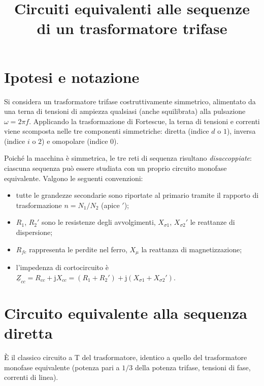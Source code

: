 \documentclass[11pt,a4paper]{article}
\title{Circuiti equivalenti alle sequenze\\di un trasformatore trifase}
\author{}
\date{}
\newcommand{\ph}[1]{\underline{#1}}
\begin{document}
\maketitle

\section{Ipotesi e notazione}

Si considera un trasformatore trifase costruttivamente simmetrico, alimentato da
una terna di tensioni di ampiezza qualsiasi (anche squilibrata) alla pulsazione
$\omega = 2\pi f$. Applicando la trasformazione di Fortescue, la terna di
tensioni e correnti viene scomposta nelle tre componenti simmetriche:
diretta (indice $d$ o $1$), inversa (indice $i$ o $2$) e omopolare
(indice $0$).

Poiché la macchina è simmetrica, le tre reti di sequenza risultano
\emph{disaccoppiate}: ciascuna sequenza può essere studiata con un proprio
circuito monofase equivalente. Valgono le seguenti convenzioni:

\begin{itemize}
  \item tutte le grandezze secondarie sono riportate al primario tramite il
        rapporto di trasformazione $n = N_1/N_2$ (apice $'$);
  \item $R_1$, $R_2'$ sono le resistenze degli avvolgimenti,
        $X_{\sigma 1}$, $X_{\sigma 2}'$ le reattanze di dispersione;
  \item $R_{fe}$ rappresenta le perdite nel ferro, $X_\mu$ la reattanza di
        magnetizzazione;
  \item l'impedenza di cortocircuito è
        $\ph{Z}_{cc} = R_{cc} + \mathrm{j}X_{cc}
         = (R_1 + R_2') + \mathrm{j}(X_{\sigma 1} + X_{\sigma 2}')$.
\end{itemize}

\section{Circuito equivalente alla sequenza diretta}

È il classico circuito a T del trasformatore, identico a quello del
trasformatore monofase equivalente (potenza pari a $1/3$ della potenza
trifase, tensioni di fase, correnti di linea).
\end{document}

